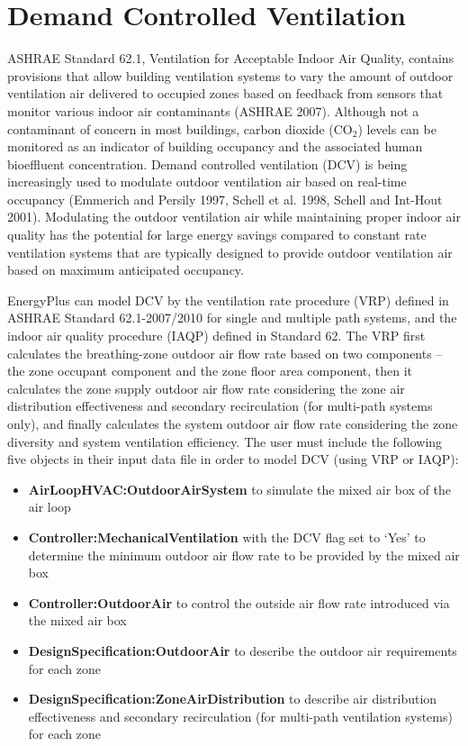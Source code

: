 \section{Demand Controlled Ventilation }\label{demand-controlled-ventilation}

ASHRAE Standard 62.1, Ventilation for Acceptable Indoor Air Quality, contains provisions that allow building ventilation systems to vary the amount of outdoor ventilation air delivered to occupied zones based on feedback from sensors that monitor various indoor air contaminants (ASHRAE 2007). Although not a contaminant of concern in most buildings, carbon dioxide (CO\(_{2}\)) levels can be monitored as an indicator of building occupancy and the associated human bioeffluent concentration. Demand controlled ventilation (DCV) is being increasingly used to modulate outdoor ventilation air based on real-time occupancy (Emmerich and Persily 1997, Schell et al. 1998, Schell and Int-Hout 2001). Modulating the outdoor ventilation air while maintaining proper indoor air quality has the potential for large energy savings compared to constant rate ventilation systems that are typically designed to provide outdoor ventilation air based on maximum anticipated occupancy.

EnergyPlus can model DCV by the ventilation rate procedure (VRP) defined in ASHRAE Standard 62.1-2007/2010 for single and multiple path systems, and the indoor air quality procedure (IAQP) defined in Standard 62. The VRP first calculates the breathing-zone outdoor air flow rate based on two components -- the zone occupant component and the zone floor area component, then it calculates the zone supply outdoor air flow rate considering the zone air distribution effectiveness and secondary recirculation (for multi-path systems only), and finally calculates the system outdoor air flow rate considering the zone diversity and system ventilation efficiency. The user must include the following five objects in their input data file in order to model DCV (using VRP or IAQP):

\begin{itemize}
  \item \textbf{AirLoopHVAC:OutdoorAirSystem} to simulate the mixed air box of the air loop
  \item \textbf{Controller:MechanicalVentilation} with the DCV flag set to `Yes' to determine the minimum outdoor air flow rate to be provided by the mixed air box
  \item \textbf{Controller:OutdoorAir} to control the outside air flow rate introduced via the mixed air box
  \item \textbf{DesignSpecification:OutdoorAir} to describe the outdoor air requirements for each zone
  \item \textbf{DesignSpecification:ZoneAirDistribution} to describe air distribution effectiveness and secondary recirculation (for multi-path ventilation systems) for each zone
\end{itemize}

